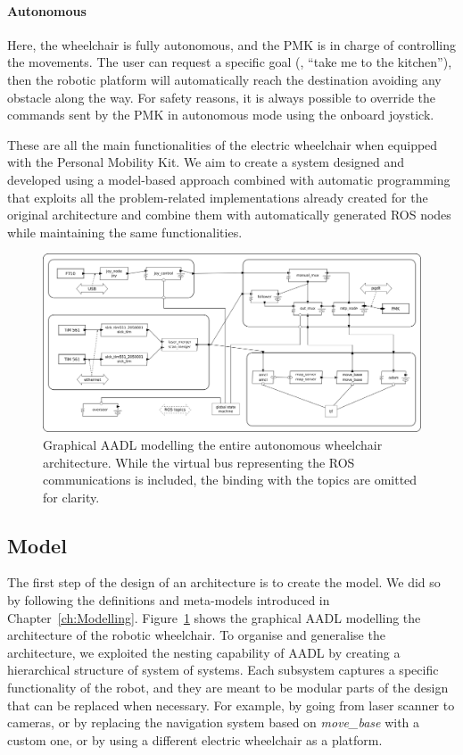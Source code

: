 \paragraph{Autonomous} Here, the wheelchair is fully autonomous, and the PMK is in charge of controlling the movements. The user can request a specific goal (\eg, ``take me to the kitchen''), then the robotic platform will automatically reach the destination avoiding any obstacle along the way. For safety reasons, it is always possible to override the commands sent by the PMK in autonomous mode using the onboard joystick.

\medskip
These are all the main functionalities of the electric wheelchair when equipped with the Personal Mobility Kit. We aim to create a system designed and developed using a model-based approach combined with automatic programming that exploits all the problem-related implementations already created for the original architecture and combine them with automatically generated ROS nodes while maintaining the same functionalities.

\begin{landscape}
	\begin{figure}[t]
	\centering
	\includegraphics[width=0.95\textheight]{gfx/pmk/model}
	\caption[Graphical AADL modelling the entire autonomous wheelchair architecture.]{Graphical AADL modelling the entire autonomous wheelchair architecture. While the virtual bus representing the ROS communications is included, the binding with the topics are omitted for clarity.}
	\label{fig:pmk-model}
	\end{figure}
\end{landscape}


\subsection{Model}
\label{sec:pmk-model}
The first step of the design of an architecture is to create the model. We did so by following the definitions and meta-models introduced in Chapter~\ref{ch:Modelling}. Figure~\ref{fig:pmk-model} shows the graphical AADL modelling the architecture of the robotic wheelchair. To organise and generalise the architecture, we exploited the nesting capability of AADL by creating a hierarchical structure of system of systems. Each subsystem captures a specific functionality of the robot, and they are meant to be modular parts of the design that can be replaced when necessary. For example, by going from laser scanner to cameras, or by replacing the navigation system based on \textit{move\_base} with a custom one, or by using a different electric wheelchair as a platform.

